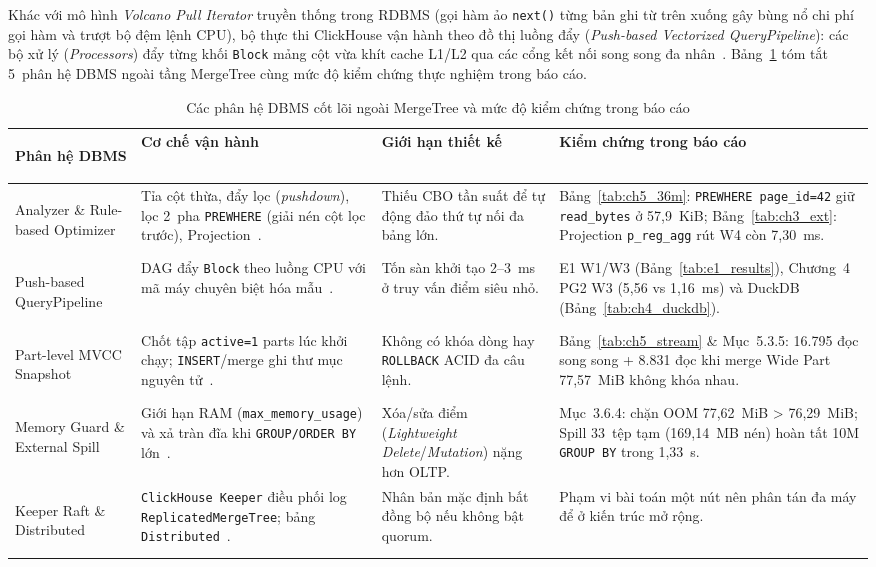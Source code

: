 \documentclass[13pt,a4paper]{report}
\begin{document}
Khác với mô hình \textit{Volcano Pull Iterator} truyền thống trong RDBMS (gọi hàm ảo \texttt{next()} từng bản ghi từ trên xuống gây bùng nổ chi phí gọi hàm và trượt bộ đệm lệnh CPU), bộ thực thi ClickHouse vận hành theo đồ thị luồng đẩy (\textit{Push-based Vectorized QueryPipeline}): các bộ xử lý (\textit{Processors}) đẩy từng khối \texttt{Block} mảng cột vừa khít cache L1/L2 qua các cổng kết nối song song đa nhân~\cite{A1, A2}. Bảng~\ref{tab:ch_subsystems} tóm tắt 5~phân hệ DBMS ngoài tầng MergeTree cùng mức độ kiểm chứng thực nghiệm trong báo cáo.

\begin{table}[!htb]
\centering
\scriptsize
\renewcommand{\arraystretch}{1.14}
\caption{Các phân hệ DBMS cốt lõi ngoài MergeTree và mức độ kiểm chứng trong báo cáo}
\label{tab:ch_subsystems}
\begin{tabularx}{\textwidth}{>{\bfseries\raggedright\arraybackslash}p{2.75cm} >{\raggedright\arraybackslash}p{4.65cm} >{\raggedright\arraybackslash}p{3.65cm} >{\raggedright\arraybackslash}X}
\toprule
\textbf{Phân hệ DBMS} & \textbf{Cơ chế vận hành} & \textbf{Giới hạn thiết kế} & \textbf{Kiểm chứng trong báo cáo} \\
\midrule
Analyzer \& Rule-based Optimizer & Tỉa cột thừa, đẩy lọc (\textit{pushdown}), lọc 2~pha \texttt{PREWHERE} (giải nén cột lọc trước), Projection~\cite{A1, S7}. & Thiếu CBO tần suất để tự động đảo thứ tự nối đa bảng lớn. & Bảng~\ref{tab:ch5_36m}: \texttt{PREWHERE page\_\allowbreak{}id=42} giữ \texttt{read\_\allowbreak{}bytes} ở 57,9~KiB; Bảng~\ref{tab:ch3_ext}: Projection \texttt{p\_\allowbreak{}reg\_\allowbreak{}agg} rút W4 còn 7,30~ms. \\
\addlinespace[3pt]
Push-based QueryPipeline & DAG đẩy \texttt{Block} theo luồng CPU với mã máy chuyên biệt hóa mẫu~\cite{A1}. & Tốn sàn khởi tạo 2--3~ms ở truy vấn điểm siêu nhỏ. & E1 W1/W3 (Bảng~\ref{tab:e1_results}), Chương~4 PG2 W3 (5,56 vs 1,16~ms) và DuckDB (Bảng~\ref{tab:ch4_duckdb}). \\
\addlinespace[3pt]
Part-level MVCC Snapshot & Chốt tập \texttt{active=1} parts lúc khởi chạy; \texttt{INSERT}/merge ghi thư mục nguyên tử~\cite{A1, S3}. & Không có khóa dòng hay \texttt{ROLLBACK} ACID đa câu lệnh. & Bảng~\ref{tab:ch5_stream} \& Mục~5.3.5: 16.795 đọc song song + 8.831 đọc khi merge Wide Part 77,57~MiB không khóa nhau. \\
\addlinespace[3pt]
Memory Guard \& External Spill & Giới hạn RAM (\texttt{max\_\allowbreak{}memory\_\allowbreak{}usage}) và xả tràn đĩa khi \texttt{GROUP/\allowbreak{}ORDER BY} lớn~\cite{S1}. & Xóa/sửa điểm (\textit{Lightweight Delete}/\textit{Mutation}) nặng hơn OLTP. & Mục~3.6.4: chặn OOM 77,62~MiB > 76,29~MiB; Spill 33~tệp tạm (169,14~MB nén) hoàn tất 10M \texttt{GROUP BY} trong 1,33~s. \\
\addlinespace[3pt]
Keeper Raft \& Distributed & \texttt{ClickHouse Keeper} điều phối log \texttt{ReplicatedMergeTree}; bảng \texttt{Distributed}~\cite{A1, V4}. & Nhân bản mặc định bất đồng bộ nếu không bật quorum. & Phạm vi bài toán một nút nên phân tán đa máy để ở kiến trúc mở rộng. \\
\bottomrule
\end{tabularx}
\end{table}
\end{document}
